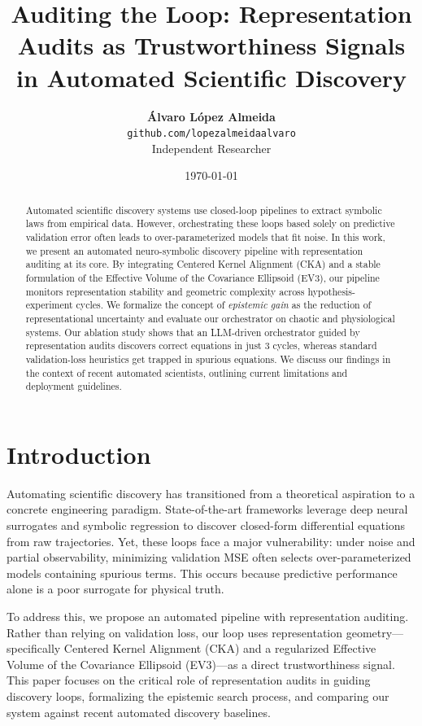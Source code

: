 \documentclass{article}
\title{\textbf{Auditing the Loop: Representation Audits as Trustworthiness Signals in Automated Scientific Discovery}}
\author{
  \textbf{Álvaro López Almeida} \\
  \small \texttt{github.com/lopezalmeidaalvaro} \\
  \small Independent Researcher
}
\date{\today}
\begin{document}
\maketitle

\begin{abstract}
Automated scientific discovery systems use closed-loop pipelines to extract symbolic laws from empirical data. However, orchestrating these loops based solely on predictive validation error often leads to over-parameterized models that fit noise. In this work, we present an automated neuro-symbolic discovery pipeline with representation auditing at its core. By integrating Centered Kernel Alignment (CKA) and a stable formulation of the Effective Volume of the Covariance Ellipsoid (EV3), our pipeline monitors representation stability and geometric complexity across hypothesis-experiment cycles. We formalize the concept of \textit{epistemic gain} as the reduction of representational uncertainty and evaluate our orchestrator on chaotic and physiological systems. Our ablation study shows that an LLM-driven orchestrator guided by representation audits discovers correct equations in just 3 cycles, whereas standard validation-loss heuristics get trapped in spurious equations. We discuss our findings in the context of recent automated scientists, outlining current limitations and deployment guidelines.
\end{abstract}

\section{Introduction}
\label{sec:intro}
Automating scientific discovery has transitioned from a theoretical aspiration to a concrete engineering paradigm. State-of-the-art frameworks leverage deep neural surrogates and symbolic regression to discover closed-form differential equations from raw trajectories. Yet, these loops face a major vulnerability: under noise and partial observability, minimizing validation MSE often selects over-parameterized models containing spurious terms. This occurs because predictive performance alone is a poor surrogate for physical truth.

To address this, we propose an automated pipeline with representation auditing. Rather than relying on validation loss, our loop uses representation geometry—specifically Centered Kernel Alignment (CKA) and a regularized Effective Volume of the Covariance Ellipsoid (EV3)—as a direct trustworthiness signal. This paper focuses on the critical role of representation audits in guiding discovery loops, formalizing the epistemic search process, and comparing our system against recent automated discovery baselines.
\end{document}
